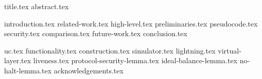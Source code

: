 \documentclass[sigconf]{acmart}
\begin{document}
\pagestyle{plain}

{title.tex}
{abstract.tex}
\maketitle
{introduction.tex}
{related-work.tex}
{high-level.tex}
{preliminaries.tex}
{pseudocode.tex}
{security.tex}
{comparison.tex}
{future-work.tex}
{conclusion.tex}

\newpage
\appendix
{uc.tex}
{functionality.tex}
{construction.tex}
{simulator.tex}
{lightning.tex}
{virtual-layer.tex}
{liveness.tex}
{protocol-security-lemma.tex}
{ideal-balance-lemma.tex}
{no-halt-lemma.tex}
{acknowledgements.tex}
\end{document}
